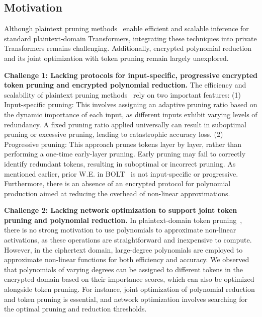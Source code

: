 \subsection{Motivation}
Although plaintext pruning methods~\citep{goyal2020power,kim2020lat,wang2021spatten} enable efficient and scalable inference for standard plaintext-domain Transformers, integrating these techniques into private Transformers remains challenging. Additionally, encrypted polynomial reduction and its joint optimization with token pruning remain largely unexplored. 

\noindent\textbf{Challenge 1: Lacking protocols for input-specific, progressive encrypted token pruning and encrypted polynomial reduction.} The efficiency and scalability of plaintext pruning methods~\citep{goyal2020power,kim2020lat,wang2021spatten} rely on two important features: (1) Input-specific pruning: This involves assigning an adaptive pruning ratio based on the dynamic importance of each input, as different inputs exhibit varying levels of redundancy. A fixed pruning ratio applied universally can result in suboptimal pruning or excessive pruning, leading to catastrophic accuracy loss. (2) Progressive pruning:  This approach prunes tokens layer by layer, rather than performing a one-time early-layer pruning. Early pruning may fail to correctly identify redundant tokens, resulting in suboptimal or incorrect pruning. As mentioned earlier, prior W.E. in BOLT~\citep{pang2023bolt} is not input-specific or progressive. Furthermore, there is an absence of an encrypted protocol for polynomial production aimed at reducing the overhead of non-linear approximations.

\noindent\textbf{Challenge 2: Lacking network optimization to support joint token pruning and polynomial reduction.} In plaintext-domain token pruning~\citep{goyal2020power,kim2020lat,wang2021spatten}, there is no strong motivation to use polynomials to approximate non-linear activations, as these operations are straightforward and inexpensive to compute. However, in the ciphertext domain, large-degree polynomials are employed to approximate non-linear functions for both efficiency and accuracy. We observed that polynomials of varying degrees can be assigned to different tokens in the encrypted domain based on their importance scores, which can also be optimized alongside token pruning. For instance, joint optimization of polynomial reduction and token pruning is essential, and network optimization involves searching for the optimal pruning and reduction thresholds.

